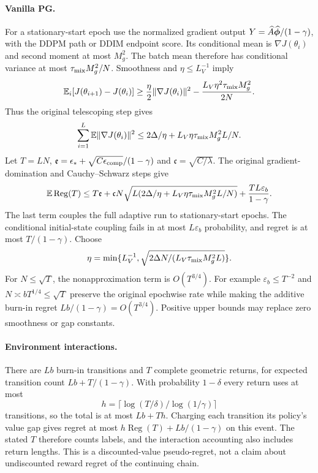 \paragraph{Vanilla PG.}
For a stationary-start epoch use the normalized gradient output
$Y=\widehat A\widehat{\boldsymbol{\phi}}/(1-\gamma)$, with the DDPM path or DDIM endpoint score.
Its conditional mean is $\nabla J(\theta_i)$ and second moment at most
$M_g^2$. The batch mean therefore has conditional variance at most
$\tau_{\rm mix}M_g^2/N$. Smoothness and $\eta\leq L_V^{-1}$ imply
\[
 \mathbb{E}_i[J(\theta_{i+1})-J(\theta_i)]
 \geq\frac\eta2\|\nabla J(\theta_i)\|^2
       -\frac{L_V\eta^2\tau_{\rm mix}M_g^2}{2N}.
\]
Thus the original telescoping step gives
\[
 \sum_{i=1}^L\mathbb{E}\|\nabla J(\theta_i)\|^2
 \leq2\Delta/\eta+L_V\eta\tau_{\rm mix}M_g^2L/N.
\]
Let $T=LN$, $\mathfrak e=\epsilon_*+
\sqrt{C\epsilon_{\rm comp}}/(1-\gamma)$ and
$\mathfrak c=\sqrt{C/\lambda}$. The original gradient-domination and
Cauchy--Schwarz steps give
\[
 \mathbb{E}\operatorname{Reg}(T)\leq T\mathfrak e+
 \mathfrak cN\sqrt{L(2\Delta/\eta+
               L_V\eta\tau_{\rm mix}M_g^2L/N)}
 +\frac{TL\varepsilon_b}{1-\gamma}.
\]
The last term couples the full adaptive run to stationary-start epochs.
The conditional initial-state coupling fails in at most $L\varepsilon_b$
probability, and regret is at most $T/(1-\gamma)$.
Choose
\[
 \eta=\min\{L_V^{-1},
       \sqrt{2\Delta N/(L_V\tau_{\rm mix}M_g^2L)}\}.
\]
For $N\leq\sqrt T$, the nonapproximation term is $O(T^{3/4})$.
For example $\varepsilon_b\leq T^{-2}$ and
$N\asymp bT^{1/4}\leq\sqrt T$ preserve the original epochwise rate while
making the additive burn-in regret $Lb/(1-\gamma)=O(T^{3/4})$.
Positive upper bounds may replace zero smoothness or gap constants.

\paragraph{Environment interactions.}
There are $Lb$ burn-in transitions and $T$ complete geometric returns,
for expected transition count $Lb+T/(1-\gamma)$. With probability
$1-\delta$ every return uses at most
\[h=\lceil\log(T/\delta)/\log(1/\gamma)\rceil\]
transitions, so the total
is at most $Lb+Th$. Charging each transition its policy's value gap gives
regret at most $h\operatorname{Reg}(T)+Lb/(1-\gamma)$ on this event.
The stated $T$ therefore counts labels, and the interaction accounting
also includes return lengths. This is a discounted-value pseudo-regret,
not a claim about undiscounted reward regret of the continuing chain.


